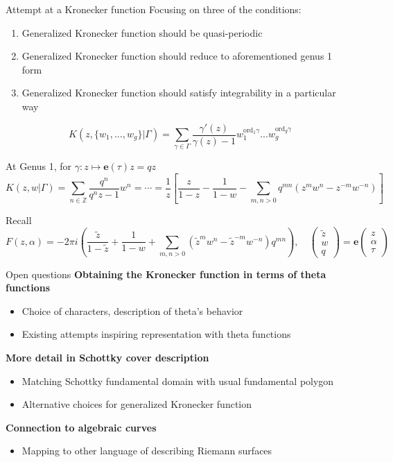 \documentclass[11pt,aspectratio=169]{beamer}
\newcommand{\ee}[0]{\mathbf{e}}
\begin{document}
\begin{frame}{Attempt at a Kronecker function}{\tiny \cite{Cha22}}
    Focusing on three of the conditions:
    \begin{enumerate}
        \item Generalized Kronecker function should be quasi-periodic
        \item Generalized Kronecker function should reduce to aforementioned genus 1 form
        \item Generalized Kronecker function should satisfy integrability in a particular way
    \end{enumerate}


    \[K(z,\{w_1,...,w_g\}|\Gamma) = \sum_{\gamma \in \Gamma} \frac{\gamma'(z)}{\gamma(z)-1} w_1^{\mathrm{ord}_1\gamma}...w_g^{\mathrm{ord}_g\gamma}\]
    

    At Genus 1, for $\gamma : z \mapsto \ee(\tau) z = qz$
    \[K(z,w|\Gamma) = \sum_{n \in \mathbb Z} \frac{q^n}{q^n z - 1} w^n = \cdots = \frac{1}{z} \left[\frac{z}{1-z} - \frac{1}{1-w} - \sum_{m,n > 0} q^{mn} (z^m w^n - z^{-m} w^{-n})\right]\]
    
    
    Recall
    \[F(z,\alpha) = -2\pi i \left(\frac{\tilde z}{1-\tilde z} + \frac{1}{1-w} + \sum_{m,n > 0} (\tilde z^m w^n - \tilde z^{-m} w^{-n}) q^{mn}\right) , \quad \begin{pmatrix} \tilde z \\ w \\ q \end{pmatrix} = \ee \begin{pmatrix}z \\ \alpha \\ \tau\end{pmatrix}\]
\end{frame}

\begin{frame}{Open questions}
    \textbf{Obtaining the Kronecker function in terms of theta functions}
    \begin{itemize}
        \item Choice of characters, description of theta's behavior
        \item Existing attempts inspiring representation with theta functions
    \end{itemize}

    \textbf{More detail in Schottky cover description}
    \begin{itemize}
        \item Matching Schottky fundamental domain with usual fundamental polygon
        \item Alternative choices for generalized Kronecker function
    \end{itemize}

    \textbf{Connection to algebraic curves}
    \begin{itemize}
        \item Mapping to other language of describing Riemann surfaces
    \end{itemize}
\end{frame}
\end{document}

